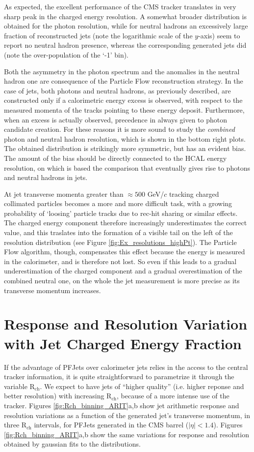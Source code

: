 \documentclass{cmspaper}
\begin{document}
As expected, the excellent performance of the CMS tracker translates in very sharp peak in the charged energy resolution. A somewhat broader  distribution is obtained for the photon resolution, while for neutral hadrons an excessively large fraction of reconstructed jets (note the logarithmic scale of the $y$-axis) seem to report no neutral hadron presence, whereas the corresponding generated jets did (note the over-population of the `-1' bin).

Both the asymmetry in the photon spectrum and the anomalies in the neutral hadron one are consequence of the Particle Flow reconstruction strategy. In the case of jets, both photons and neutral hadrons, as previously described, are constructed only if a calorimetric energy excess is observed, with respect to the measured momenta of the tracks pointing to these energy deposit. Furthermore, when an excess is actually observed, precedence in always given to photon candidate creation. For these reasons it is more sound to study the {\em combined} photon and neutral hadron resolution, which is shown in the bottom right plots. The obtained distribution is strikingly more symmetric, but has an evident bias. The amount of the bias should be directly connected to the HCAL energy resolution, on which is based the comparison that eventually gives rise to photons and neutral hadrons in jets.

At jet transverse momenta greater than $\approx 500$ GeV/$c$ tracking charged collimated particles becomes a more and more difficult task, with a growing probability of `loosing' particle tracks due to rec-hit sharing or similar effects. The charged energy component therefore increasingly underestimates the correct value, and this traslates into the formation of a visible tail on the left of the resolution distribution (see Figure \ref{fig:Ex_resolutions_highPt}). The Particle Flow algorithm, though, compensates this effect because the energy is measured in the calorimeter, and is therefore not lost. So even if this leads to a gradual underestimation of the charged component and a gradual overestimation of the combined neutral one, on the whole the jet measurement is more precise as its transverse momentum increases.



\section{Response and Resolution Variation with Jet Charged Energy Fraction}
\label{sec:MCtest}
If the advantage of PFJets over calorimeter jets relies in the access to the central tracker information, it is quite straightforward to parametrize it through the variable R$_{\mathrm{ch}}$. We expect to have jets of ``higher quality'' (i.e. higher reponse and better resolution) with increasing R$_{\mathrm{ch}}$, because of a more intense use of the tracker. Figures \ref{fig:Rch_binning_ARIT}a,b show jet arithmetic response and resolution variations as a function of the generated jet's transverse momentum, in three R$_{\mathrm{ch}}$ intervals, for PFJets generated in the CMS barrel ($|\eta|<1.4$). Figures \ref{fig:Rch_binning_ARIT}a,b show the same variations for response and resolution obtained by gaussian fits to the distributions.
\end{document}

